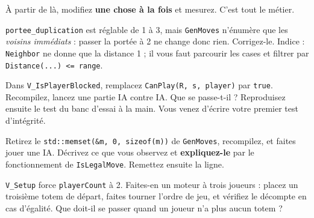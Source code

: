 À partir de là, modifiez \textbf{une chose à la fois} et mesurez. C'est tout le
métier.

\begin{nkexo}[1 — La portée]
\texttt{portee\_duplication} est réglable de 1 à 3, mais \texttt{GenMoves}
n'énumère que les \emph{voisins immédiats} : passer la portée à 2 ne change donc
rien. Corrigez-le. Indice : \texttt{Neighbor} ne donne que la distance 1 ; il vous
faut parcourir les cases et filtrer par \texttt{Distance(...) <= range}.
\end{nkexo}

\begin{nkexo}
Dans \texttt{V\_IsPlayerBlocked}, remplacez \texttt{CanPlay(R, s, player)} par
\texttt{true}. Recompilez, lancez une partie IA contre IA. Que se passe-t-il ?
Reproduisez ensuite le test du banc d'essai à la main. Vous venez d'écrire votre
premier test d'intégrité.
\end{nkexo}

\begin{nkexo}
Retirez le \texttt{std::memset(\&m, 0, sizeof(m))} de \texttt{GenMoves},
recompilez, et faites jouer une IA. Décrivez ce que vous observez et
\textbf{expliquez-le} par le fonctionnement de \texttt{IsLegalMove}. Remettez
ensuite la ligne.
\end{nkexo}

\begin{nkexo}
\texttt{V\_Setup} force \texttt{playerCount} à 2. Faites-en un moteur à trois
joueurs : placez un troisième totem de départ, faites tourner l'ordre de jeu, et
vérifiez le décompte en cas d'égalité. Que doit-il se passer quand un joueur n'a
plus aucun totem ?
\end{nkexo}

